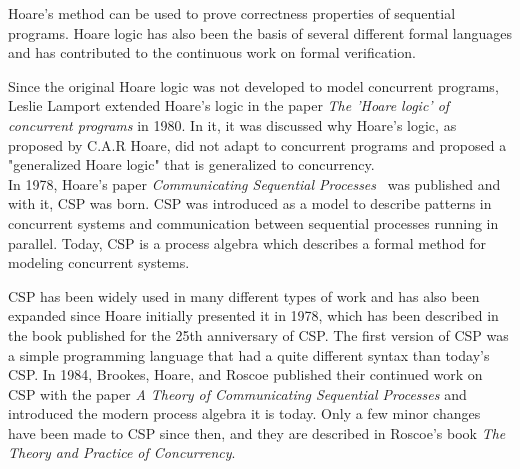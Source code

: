 Hoare's method can be used to prove correctness properties of sequential programs. Hoare logic has also been the basis of several different formal languages and has contributed to the continuous work on formal verification.

Since the original Hoare logic was not developed to model concurrent programs, Leslie Lamport extended Hoare's logic in the paper \textit{The 'Hoare logic' of concurrent programs}\cite{Lamport1980} in 1980. In it, it was discussed why Hoare's logic, as proposed by C.A.R Hoare, did not adapt to concurrent programs and proposed a "generalized Hoare logic" that is generalized to concurrency. \\

In 1978, Hoare's paper \textit{Communicating Sequential Processes}~\cite{Hoare1978} was published and with it, CSP was born.
CSP was introduced as a model to describe patterns in concurrent systems and communication between sequential processes running in parallel. Today, CSP is a process algebra which describes a formal method for modeling concurrent systems.

CSP has been widely used in many different types of work and has also been expanded since Hoare initially presented it in 1978, which has been described in the book\cite{Abdallah2005} published for the 25th anniversary of CSP.
The first version of CSP was a simple programming language that had a quite different syntax than today's CSP. In 1984, Brookes, Hoare, and Roscoe published their continued work on CSP with the paper \textit{A Theory of Communicating Sequential Processes}\cite{Brookes1984} and introduced the modern process algebra it is today. Only a few minor changes have been made to CSP since then, and they are described in Roscoe's book \textit{The Theory and Practice of Concurrency}\cite{Roscoe1997}.\\


